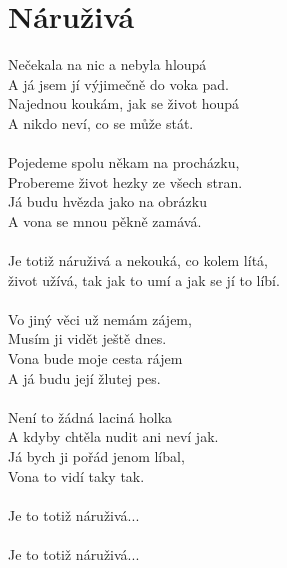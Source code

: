 \section{Náruživá}
Nečekala na nic a nebyla hloupá\\
A já jsem jí výjimečně do voka pad.\\
Najednou koukám, jak se život houpá\\
A nikdo neví, co se může stát.\\
\\
Pojedeme spolu někam na procházku,\\
Probereme život hezky ze všech stran.\\
Já budu hvězda jako na obrázku\\
A vona se mnou pěkně zamává.\\
\\
Je totiž náruživá a nekouká, co kolem lítá,\\
život užívá, tak jak to umí a jak se jí to líbí.\\
\\
Vo jiný věci už nemám zájem,\\
Musím ji vidět ještě dnes.\\
Vona bude moje cesta rájem\\
A já budu její žlutej pes.\\
\\
Není to žádná laciná holka\\
A kdyby chtěla nudit ani neví jak.\\
Já bych ji pořád jenom líbal,\\
Vona to vidí taky tak.\\
\\
Je to totiž náruživá...\\
\\
Je to totiž náruživá...\\